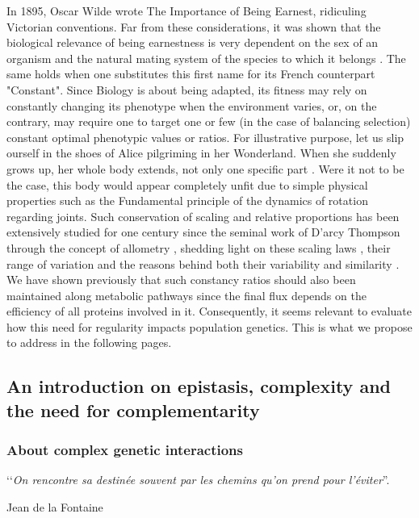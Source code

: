 In 1895, Oscar Wilde wrote The Importance of Being Earnest, ridiculing Victorian conventions. Far from these considerations, it was shown that the biological relevance of being earnestness is very dependent on the sex of an organism and the natural mating system of the species to which it belongs \citep{Wade80,Darwin08,Shuster09,Tilquin16}. The same holds when one substitutes this first name for its French counterpart "Constant". Since Biology is about being adapted, its fitness may rely on constantly changing its phenotype when the environment varies, or, on the contrary, may require one to target one or few (in the case of balancing selection) constant optimal phenotypic values or ratios. For illustrative purpose, let us slip ourself in the shoes of Alice pilgriming in her Wonderland. When she suddenly grows up, her whole body extends, not only one specific part \citep{Carroll66}. Were it not to be the case, this body would appear completely unfit due to simple physical properties such as the Fundamental principle of the dynamics of rotation regarding joints. Such conservation of scaling and relative proportions has been extensively studied for one century since the seminal work of D'arcy Thompson \citep{Darcy92} through the concept of allometry \citep{Gould66,Cheverud82,Damuth01,Dill11}, shedding light on these scaling laws \citep{West05}, their range of variation and the reasons behind both their variability and similarity \citep{Pelabon14}. We have shown previously that such constancy ratios should also been maintained along metabolic pathways since the final flux depends on the efficiency of all proteins involved in it. Consequently, it seems relevant to evaluate how this need for regularity impacts population genetics. This is what we propose to address in the following pages.

\subsection{{An introduction on epistasis, complexity and the need for complementarity}\label{sec:Intro-Epi-Complex}}

\subsubsection{About complex genetic interactions}

‘‘\textit{On rencontre sa destinée souvent par les chemins qu'on prend pour l'éviter}''.

Jean de la Fontaine

